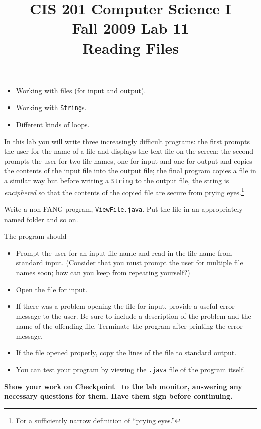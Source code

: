 \documentclass[12pt,oneside]{memoir}
\title{CIS 201 Computer Science I\\Fall 2009 Lab #1\\#2}%
\newcommand\code[1]{\lstinline^#1^}
\newcommand\fname[1]{\texttt{#1}}
\newenvironment{Checkpoint}[1]{%
  \begin{Exercise}[name={Checkpoint},title={#1}]}{%
  \end{Exercise}%
  \textbf{Show your work on Checkpoint~\theExercise{} to the lab monitor, %
    answering any necessary questions for them.  Have them sign before continuing.}}
\newcommand{\lab}[2]{%
  \title{CIS 201 Computer Science I\\Fall 2009 Lab #1\\#2}%
  \maketitle%
}
\begin{document}
\lab{11}{Reading Files}

\begin{itemize}
\item Working with files (for input and output).
\item Working with \code{String}s.
\item Different kinds of loops.
\end{itemize}

In this lab you will write three increasingly difficult programs: the
first prompts the user for the name of a file and displays the text
file on the screen; the second prompts the user for two file names,
one for input and one for output and copies the contents of the input
file into the output file; the final program copies a file in a
similar way but before writing a \code{String} to the output file, the
string is \emph{enciphered} so that the contents of the copied file
are secure from prying eyes.\footnote{For a sufficiently narrow
  definition of ``prying eyes.''}

\begin{Checkpoint}{ViewFile.java}
Write a non-FANG program, \code{ViewFile.java}. Put the file in an
appropriately named folder and so on. 

The program should
\begin{itemize}
\item Prompt the user for an input file name and read in the file name
  from standard input. (Consider that you must prompt the user for
  multiple file names soon; how can you keep from repeating yourself?)
\item Open the file for input.
\item If there was a problem opening the file for input, provide a
  useful error message to the user. Be sure to include a description
  of the problem and the name of the offending file. Terminate the
  program after printing the error message.
\item If the file opened properly, copy the lines of the file to
  standard output.
\item You can test your program by viewing the \fname{.java} file of
  the program itself.
\end{itemize}
\end{Checkpoint}
\end{document}
